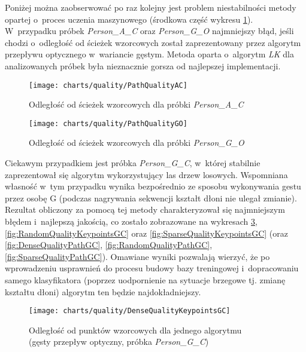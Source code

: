     Poniżej można zaobserwować po raz kolejny jest problem niestabilności metody opartej o~proces uczenia maszynowego (środkowa część wykresu \ref{fig:PathQualityAC}). W~przypadku próbek \textit{Person\_A\_C} oraz \textit{Person\_G\_O} najmniejszy błąd, jeśli chodzi o~odległość od ścieżek wzorcowych został zaprezentowany przez algorytm przepływu optycznego w~wariancie gęstym. Metoda oparta o~algorytm \textit{LK} dla analizowanych próbek była nieznacznie gorsza od najlepszej implementacji.

    \newpage
      \begin{figure}[!ht]
        \centering
        \texttt{[image: charts/quality/PathQualityAC]}
        \caption[Odległość od ścieżek wzorcowych (próbka osoby A, gest C)]
                {Odległość od ścieżek wzorcowych dla próbki \textit{Person\_A\_C}}
        \label{fig:PathQualityAC}
      \end{figure}

      \begin{figure}[!ht]
        \centering
        \texttt{[image: charts/quality/PathQualityGO]}
        \caption[Odległość od ścieżek wzorcowych (próbka osoby G, gest O)]
                {Odległość od ścieżek wzorcowych dla próbki \textit{Person\_G\_O}}
        \label{fig:PathQualityGO}
      \end{figure}

    Ciekawym przypadkiem jest próbka \textit{Person\_G\_C}, w~której stabilnie zaprezentował się algorytm wykorzystujący las drzew losowych. Wspomniana własność w~tym przypadku wynika bezpośrednio ze sposobu wykonywania gestu przez osobę G (podczas nagrywania sekwencji kształt dłoni nie ulegał zmianie). Rezultat obliczony za pomocą tej metody charakteryzował się najmniejszym błędem i~najlepszą jakością, co zostało zobrazowane na wykresach \ref{fig:DenseQualityKeypointsGC}, \ref{fig:RandomQualityKeypointsGC} oraz \ref{fig:SparseQualityKeypointsGC} (oraz \ref{fig:DenseQualityPathGC}, \ref{fig:RandomQualityPathGC}, \ref{fig:SparseQualityPathGC}). Omawiane wyniki pozwalają wierzyć, że po wprowadzeniu usprawnień do procesu budowy bazy treningowej i~dopracowaniu samego klasyfikatora (poprzez uodpornienie na sytuacje brzegowe tj. zmianę kształtu dłoni) algorytm ten będzie najdokładniejszy.

    \newpage
      \begin{figure}[!ht]
        \centering
        \texttt{[image: charts/quality/DenseQualityKeypointsGC]}
        \caption[Odległość od punktów wzorcowych dla jednego algorytmu (gęsty przepływ optyczny, osoba G, gest C)]
                {Odległość od punktów wzorcowych dla jednego algorytmu\\(gęsty przepływ optyczny, próbka \textit{Person\_G\_C})}
        \label{fig:DenseQualityKeypointsGC}
      \end{figure}


